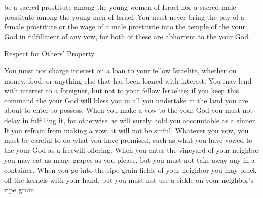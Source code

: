 {be
a sacred prostitute
among the young women
of Israel
nor
a sacred male prostitute
among the young
men of Israel.
You must never
bring
the pay
of a female prostitute
or the wage
of a male prostitute
into the temple
of the {}
your God
in fulfillment of any
vow,
for
both
of these are abhorrent
to the
{}
your God.
\par }{\SH Respect for Others’ Property
\par }{\PP {}You must not
charge interest on
a loan
to your fellow
Israelite, whether on
money,
food,
or anything
else that has been loaned
with interest.
You may lend
with interest
to a foreigner,
but not
to your fellow
Israelite;
if you keep
this command the
{}
your God
will bless
you in all
you undertake
in the land
you
are about
to enter
to possess.
When
you make
a vow
to the
{}
your God
you must not
delay
in fulfilling
it, for otherwise he will surely
hold
you accountable
as a sinner.
If
you refrain
from making a vow,
it will not
be
sinful.
Whatever you vow,
you must be careful
to do
what
you have promised,
such as what you have vowed
to the
{}
your God
as a freewill offering.
When
you enter
the vineyard
of your neighbor
you may eat
as many grapes
as you please,
but you must not
take away
any in
a container.
When
you go
into the ripe grain
fields of your neighbor
you may pluck
off the kernels
with your hand,
but you must not
use
a sickle
on
your neighbor’s
ripe grain.

}
